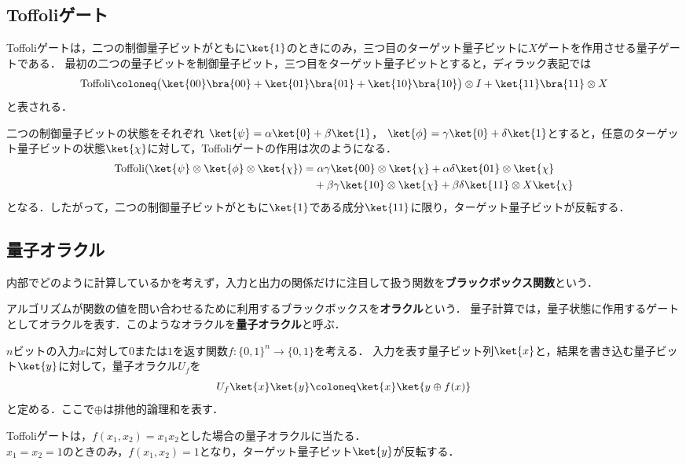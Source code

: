 \subsection{Toffoliゲート}
\begin{defi}[Toffoliゲート]
Toffoliゲートは，二つの制御量子ビットがともに$\ket{1}$のときにのみ，三つ目のターゲット量子ビットに$X$ゲートを作用させる量子ゲートである．
最初の二つの量子ビットを制御量子ビット，三つ目をターゲット量子ビットとすると，ディラック表記では
\[
  \text{Toffoli}
  \coloneq \bigl(\ket{00}\bra{00}+\ket{01}\bra{01}+\ket{10}\bra{10}\bigr)\otimes I
  +\ket{11}\bra{11}\otimes X
\]
と表される．
\end{defi}
二つの制御量子ビットの状態をそれぞれ
$\ket{\psi}=\alpha\ket{0}+\beta\ket{1}$，
$\ket{\phi}=\gamma\ket{0}+\delta\ket{1}$とすると，任意のターゲット量子ビットの状態$\ket{\chi}$に対して，Toffoliゲートの作用は次のようになる．
\begin{align*}
  \text{Toffoli}(\ket{\psi}\otimes\ket{\phi}\otimes\ket{\chi})
   & =\alpha\gamma\ket{00}\otimes\ket{\chi}
  +\alpha\delta\ket{01}\otimes\ket{\chi}        \\
   & \quad+\beta\gamma\ket{10}\otimes\ket{\chi}
  +\beta\delta\ket{11}\otimes X\ket{\chi}
\end{align*}
となる．したがって，二つの制御量子ビットがともに$\ket{1}$である成分$\ket{11}$に限り，ターゲット量子ビットが反転する．

\subsection{量子オラクル}
内部でどのように計算しているかを考えず，入力と出力の関係だけに注目して扱う関数を\textbf{ブラックボックス関数}という．

アルゴリズムが関数の値を問い合わせるために利用するブラックボックスを\textbf{オラクル}という．
量子計算では，量子状態に作用するゲートとしてオラクルを表す．このようなオラクルを\textbf{量子オラクル}と呼ぶ．

\begin{defi}[関数$f$の量子オラクル]
$n$ビットの入力$x$に対して$0$または$1$を返す関数$f:\{0,1\}^n\to\{0,1\}$を考える．
入力を表す量子ビット列$\ket{x}$と，結果を書き込む量子ビット$\ket{y}$に対して，量子オラクル$U_f$を
\[
  U_f\ket{x}\ket{y}\coloneq\ket{x}\ket{y\oplus f(x)}
\]
と定める．ここで$\oplus$は排他的論理和を表す．
\end{defi}
Toffoliゲートは，$f(x_1,x_2)=x_1x_2$とした場合の量子オラクルに当たる．\\
$x_1 = x_2 = 1$のときのみ，$f(x_1,x_2)=1$となり，ターゲット量子ビット$\ket{y}$が反転する．
